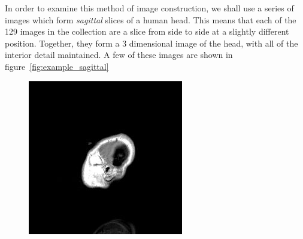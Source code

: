     In order to examine this method of image construction, we shall use a series of images which form \textit{sagittal} slices of a human head. This means that each of the 129 images in the collection are a slice from side to side at a slightly different position. Together, they form a 3 dimensional image of the head, with all of the interior detail maintained. A few of these images are shown in figure~\ref{fig:example_sagittal}
    \begin{figure}[ht]
        \centering
        \begin{minipage}[c]{0.19\linewidth}
            \centering
            \includegraphics[width=\textwidth]{Files/report_images/sagittal_example1.jpg}
        \end{minipage}
        \begin{minipage}[c]{0.19\linewidth}
            \centering

\end{minipage}
\end{figure}
